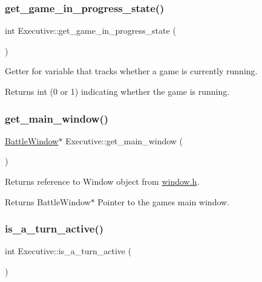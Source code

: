 \subsubsection{\texorpdfstring{get\_game\_in\_progress\_state()}{get\_game\_in\_progress\_state()}}
{\footnotesize\ttfamily int Executive\+::get\+\_\+game\+\_\+in\+\_\+progress\+\_\+state (\begin{DoxyParamCaption}{ }\end{DoxyParamCaption})}



Getter for variable that tracks whether a game is currently running. 

\begin{DoxyReturn}{Returns}
int (0 or 1) indicating whether the game is running. 
\end{DoxyReturn}
\mbox{\label{classExecutive_a97b5031314e8a65040de21d6424cb3a2}} 
\subsubsection{\texorpdfstring{get\_main\_window()}{get\_main\_window()}}
{\footnotesize\ttfamily \mbox{\hyperlink{classBattleWindow}{Battle\+Window}}$\ast$ Executive\+::get\+\_\+main\+\_\+window (\begin{DoxyParamCaption}{ }\end{DoxyParamCaption})}



Returns reference to Window object from \mbox{\hyperlink{window_8h}{window.\+h}}. 

\begin{DoxyReturn}{Returns}
Battle\+Window$\ast$ Pointer to the game\textquotesingle{}s main window. 
\end{DoxyReturn}
\mbox{\label{classExecutive_aeb65d64eb9c379f4bb55cd42e3c9e961}} 
\subsubsection{\texorpdfstring{is\_a\_turn\_active()}{is\_a\_turn\_active()}}
{\footnotesize\ttfamily int Executive\+::is\+\_\+a\+\_\+turn\+\_\+active (\begin{DoxyParamCaption}{ }\end{DoxyParamCaption})}



